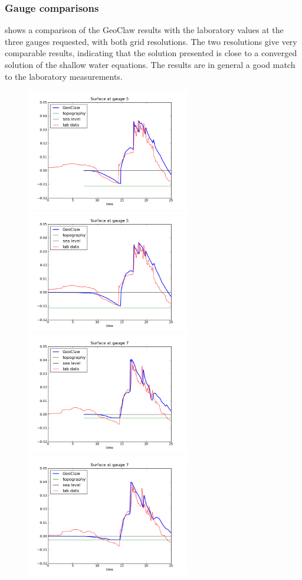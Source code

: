 \subsubsection{Gauge comparisons}

 shows a comparison of the GeoClaw results with the
laboratory values at the three gauges requested, with both grid resolutions. 
The two resolutions give very comparable results, indicating that the
solution presented is close to a converged solution of the shallow water
equations.  The results are in general a good match to the laboratory
measurements.

\begin{figure}[ht]
\hfil\includegraphics[width=2.8in]{bp7/figs423/gauge0005fig300.png}\hfil
\hfil\includegraphics[width=2.8in]{bp7/figs211/gauge0005fig300.png}\hfil
\vskip 5pt
\hfil\includegraphics[width=2.8in]{bp7/figs423/gauge0007fig300.png}\hfil
\hfil\includegraphics[width=2.8in]{bp7/figs211/gauge0007fig300.png}\hfil

\end{figure}
